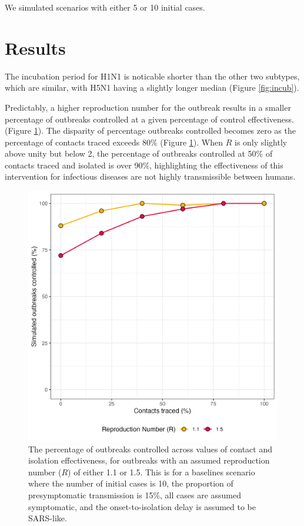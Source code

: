 \documentclass{article}
\begin{document}
We simulated scenarios with either 5 or 10 initial cases.

\section{Results}

The incubation period for H1N1 is noticable shorter than the other two subtypes, which are similar, with H5N1 having a slightly longer median (Figure \ref{fig:incub}).

Predictably, a higher reproduction number for the outbreak results in a smaller percentage of outbreaks controlled at a given percentage of control effectiveness. (Figure \ref{fig:prop-outbreak-control-R}). The disparity of percentage outbreaks controlled becomes zero as the percentage of contacts traced exceeds 80\% (Figure \ref{fig:prop-outbreak-control-R}). When $R$ is only slightly above unity but below 2, the percentage of outbreaks controlled at 50\% of contacts traced and isolated is over 90\%, highlighting the effectiveness of this intervention for infectious diseases are not highly transmissible between humans.

\begin{figure}[h]
  \centering
  \includegraphics[width=\textwidth]{../plots/prop_outbreak_control_reproduction_number.png}
  \caption{The percentage of outbreaks controlled across values of contact and isolation effectiveness, for outbreaks with an assumed reproduction number ($R$) of either 1.1 or 1.5. This is for a baselines scenario where the number of initial cases is 10, the proportion of presymptomatic transmission is 15\%, all cases are assumed symptomatic, and the onset-to-isolation delay is assumed to be SARS-like.}
  \label{fig:prop-outbreak-control-R}
\end{figure}
\end{document}
